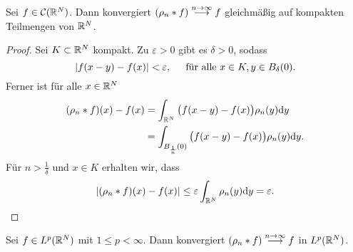 \begin{satz}\label{satz: glm konvergenz von faltung mit mollifier für C}
	Sei \(f\in\mathcal{C}(\mathbb{R}^N)\). Dann konvergiert \((\rho_n\ast f)\overset{n\rightarrow\infty}{\longrightarrow}f\) gleichmäßig auf kompakten Teilmengen von \(\mathbb{R}^N\).
\end{satz}
\begin{proof}
	Sei \(K\subset\mathbb{R}^N\) kompakt. Zu \(\varepsilon>0\) gibt es \(\delta>0\), sodass
	\begin{equation*}
		|f(x-y)-f(x)|<\varepsilon,\;\;\;\;\text{ für alle }x\in K,y\in B_\delta(0).
	\end{equation*}
	Ferner ist für alle \(x\in\mathbb{R}^N\)
	\begin{align*}
		(\rho_n\ast f)(x)-f(x)&=\int_{\mathbb{R}^N}\big(f(x-y)-f(x)\big)\rho_n(y)\mathrm{d}y\\
		&=\int_{B_\frac{1}{n}(0)}\big(f(x-y)-f(x)\big)\rho_n(y)\mathrm{d}y.
	\end{align*}
	Für \(n>\frac{1}{\delta}\) und \(x\in K\) erhalten wir, dass
	\begin{equation*}
		|(\rho_n\ast f)(x)-f(x)|\leq\varepsilon\int_{\mathbb{R}^N}\rho_n(y)\mathrm{d}y=\varepsilon.
	\end{equation*}
\end{proof}
\begin{thm}\label{thm: glm konvergenz von faltung mit mollifier für Lp}
	Sei \(f\in L^p(\mathbb{R}^N)\) mit \(1\leq p<\infty\). Dann konvergiert \((\rho_n\ast f)\overset{n\rightarrow\infty}{\longrightarrow}f\) in \(L^p(\mathbb{R}^N)\).
\end{thm}
